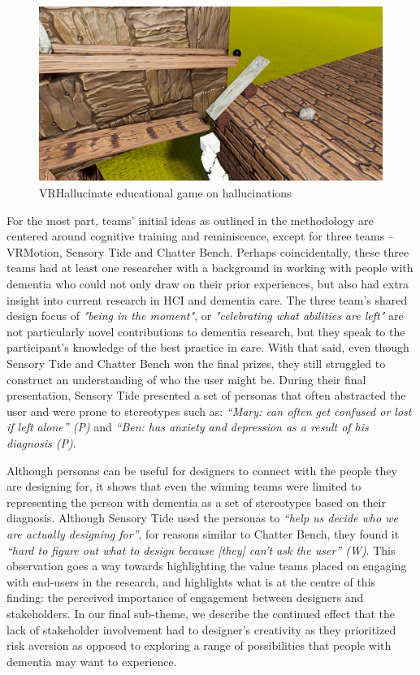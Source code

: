 \begin{figure}[htp]
\centering
\includegraphics[width=.8\linewidth]{Images/DemVR/Findings/VRHallucinate.png}
\caption{VRHallucinate educational game on hallucinations}
\label{fig:VRHallucinateDemo}
\end{figure}

For the most part, teams' initial ideas as outlined in the methodology are centered around cognitive training and reminiscence, except for three teams – VRMotion, Sensory Tide and Chatter Bench. Perhaps coincidentally, these three teams had at least one researcher with a background in working with people with dementia who could not only draw on their prior experiences, but also had extra insight into current research in HCI and dementia care. The three team’s shared design focus of \textit{"being in the moment"}, or \textit{"celebrating what abilities are left"} are not particularly novel contributions to dementia research, but they speak to the participant’s knowledge of the best practice in care. With that said, even though Sensory Tide and Chatter Bench won the final prizes, they still struggled to construct an understanding of who the user might be. During their final presentation, Sensory Tide presented a set of personas that often abstracted the user and were prone to stereotypes such as: \textit{“Mary: can often get confused or lost if left alone” (P)} and \textit{“Ben: has anxiety and depression as a result of his diagnosis (P)}. 

Although personas can be useful for designers to connect with the people they are designing for, it shows that even the winning teams were limited to representing the person with dementia as a set of stereotypes based on their diagnosis. Although Sensory Tide used the personas to \textit{“help us decide who we are actually designing for”}, for reasons similar to Chatter Bench, they found it \textit{“hard to figure out what to design because [they] can’t ask the user” (W)}. This observation goes a way towards highlighting the value teams placed on engaging with end-users in the research, and highlights what is at the centre of this finding: the perceived importance of engagement between designers and stakeholders. In our final sub-theme, we describe the continued effect that the lack of stakeholder involvement had to designer’s creativity as they prioritized risk aversion as opposed to exploring a range of possibilities that people with dementia may want to experience. 
